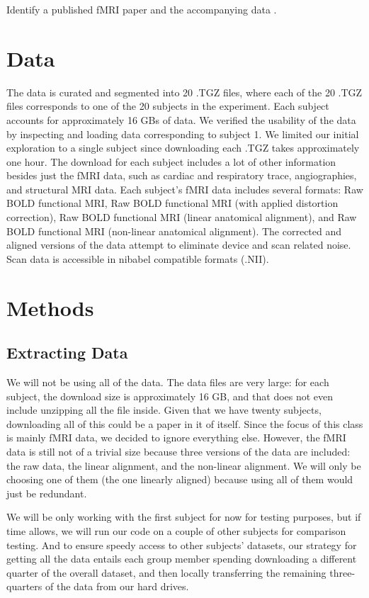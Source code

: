 \documentclass[11pt]{article}
\begin{document}
Identify a published fMRI paper and the accompanying data
\cite{hank2014audiomovie}.

\section{Data}

The data is curated and segmented into 20 .TGZ files, where each of the 20
.TGZ files corresponds to one of the 20 subjects in the experiment. Each
subject accounts for approximately 16 GBs of data. We verified the usability
of the data by inspecting and loading data corresponding to subject 1. We
limited our initial exploration to a single subject since downloading each
.TGZ takes approximately one hour. The download for each subject includes a
lot of other information besides just the fMRI data, such as cardiac and
respiratory trace, angiographies, and structural MRI data. Each subject's fMRI
data includes several formats: Raw BOLD functional MRI, Raw BOLD functional
MRI (with applied distortion correction), Raw BOLD functional MRI (linear
anatomical alignment), and Raw BOLD functional MRI (non-linear anatomical
alignment). The corrected and aligned versions of the data attempt to
eliminate device and scan related noise. Scan data is accessible in nibabel
compatible formats (.NII).

\section{Methods}

\subsection{Extracting Data}

We will not be using all of the data. The data
files are very large: for each subject, the download size is approximately 16
GB, and that does not even include unzipping all the file inside. Given that
we have twenty subjects, downloading all of this could be a paper in it of
itself. Since the focus of this class is mainly fMRI data, we decided to
ignore everything else. However, the fMRI data is still not of a trivial size
because three versions of the data are included: the raw data, the linear
alignment, and the non-linear alignment. We will only be choosing one of them
(the one linearly aligned) because using all of them would just be redundant.

We will be only working with the first subject for now for testing purposes,
but if time allows, we will run our code on a couple of other subjects for
comparison testing. And to ensure speedy access to other subjects' datasets,
our strategy for getting all the data entails each group member spending
downloading a different quarter of the overall dataset, and then locally
transferring the remaining three-quarters of the data from our hard drives.
\end{document}
